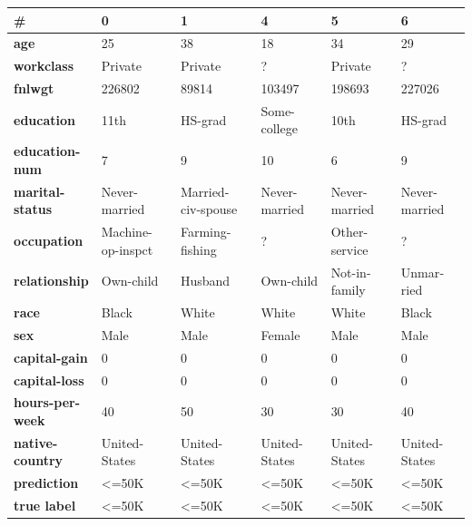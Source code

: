 \documentclass{article}
\begin{document}
\begin{latin}
\begin{table}[!hbp]
\centering
\begin{tabular}{@{}llllll@{}}
\toprule
\#                      & 0                 & 1                  & 4               & 5               & 6               \\ \midrule
\textbf{age}            & 25                & 38                 & 18              & 34              & 29              \\
\textbf{workclass}      & Private           & Private            & ?               & Private         & ?               \\
\textbf{fnlwgt}         & 226802            & 89814              & 103497          & 198693          & 227026          \\
\textbf{education}      & 11th              & HS-grad            & Some-college    & 10th            & HS-grad         \\
\textbf{education-num}  & 7                 & 9                  & 10              & 6               & 9               \\
\textbf{marital-status} & Never-married     & Married-civ-spouse & Never-married   & Never-married   & Never-married   \\
\textbf{occupation}     & Machine-op-inspct & Farming-fishing    & ?               & Other-service   & ?               \\
\textbf{relationship}   & Own-child         & Husband            & Own-child       & Not-in-family   & Unmarried       \\
\textbf{race}           & Black             & White              & White           & White           & Black           \\
\textbf{sex}            & Male              & Male               & Female          & Male            & Male            \\
\textbf{capital-gain}   & 0                 & 0                  & 0               & 0               & 0               \\
\textbf{capital-loss}   & 0                 & 0                  & 0               & 0               & 0               \\
\textbf{hours-per-week} & 40                & 50                 & 30              & 30              & 40              \\
\textbf{native-country} & United-States     & United-States      & United-States   & United-States   & United-States   \\
\textbf{prediction}     & \textless{}=50K   & \textless{}=50K    & \textless{}=50K & \textless{}=50K & \textless{}=50K \\
\textbf{true label}     & \textless{}=50K   & \textless{}=50K    & \textless{}=50K & \textless{}=50K & \textless{}=50K \\ \bottomrule
\end{tabular}
\end{table}
\end{latin}
\end{document}
